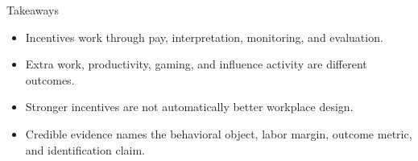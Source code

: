 \documentclass[aspectratio=169,11pt]{beamer}
\begin{document}
\begin{frame}{Takeaways}
\begin{itemize}
    \item Incentives work through pay, interpretation, monitoring, and evaluation.
    \item Extra work, productivity, gaming, and influence activity are different outcomes.
    \item Stronger incentives are not automatically better workplace design.
    \item Credible evidence names the behavioral object, labor margin, outcome metric, and identification claim.
\end{itemize}
\end{frame}
\end{document}
